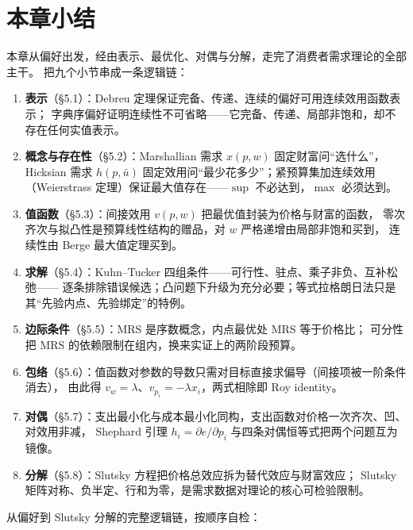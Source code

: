 \section{本章小结}

本章从偏好出发，经由表示、最优化、对偶与分解，走完了消费者需求理论的全部主干。
把九个小节串成一条逻辑链：

\begin{enumerate}
\item \textbf{表示}（\S 5.1）：Debreu 定理保证完备、传递、连续的偏好可用连续效用函数表示；
      字典序偏好证明连续性不可省略——它完备、传递、局部非饱和，却不存在任何实值表示。
\item \textbf{概念与存在性}（\S 5.2）：Marshallian 需求 $x(p,w)$ 固定财富问“选什么”，
      Hicksian 需求 $h(p,\bar u)$ 固定效用问“最少花多少”；紧预算集加连续效用
      （Weierstrass 定理）保证最大值存在——$\sup$ 不必达到，$\max$ 必须达到。
\item \textbf{值函数}（\S 5.3）：间接效用 $v(p,w)$ 把最优值封装为价格与财富的函数，
      零次齐次与拟凸性是预算线性结构的赠品，对 $w$ 严格递增由局部非饱和买到，
      连续性由 Berge 最大值定理买到。
\item \textbf{求解}（\S 5.4）：Kuhn--Tucker 四组条件——可行性、驻点、乘子非负、互补松弛——
      逐条排除错误候选；凸问题下升级为充分必要；等式拉格朗日法只是其“先验内点、先验绑定”的特例。
\item \textbf{边际条件}（\S 5.5）：MRS 是序数概念，内点最优处 MRS 等于价格比；
      可分性把 MRS 的依赖限制在组内，换来实证上的两阶段预算。
\item \textbf{包络}（\S 5.6）：值函数对参数的导数只需对目标直接求偏导（间接项被一阶条件消去），
      由此得 $v_w=\lambda$、$v_{p_i}=-\lambda x_i$，两式相除即 Roy identity。
\item \textbf{对偶}（\S 5.7）：支出最小化与成本最小化同构，支出函数对价格一次齐次、凹、对效用非减，
      Shephard 引理 $h_i=\partial e/\partial p_i$ 与四条对偶恒等式把两个问题互为镜像。
\item \textbf{分解}（\S 5.8）：Slutsky 方程把价格总效应拆为替代效应与财富效应；
      Slutsky 矩阵对称、负半定、行和为零，是需求数据对理论的核心可检验限制。
\end{enumerate}

\noindent 从偏好到 Slutsky 分解的完整逻辑链，按顺序自检：

